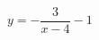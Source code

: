 \hspace*{2mm}\begin{minipage}[t]{\dimexpr\linewidth-2mm\relax}\vspace{0pt}
$y=-\dfrac{3}{x-4}-1$\end{minipage}
